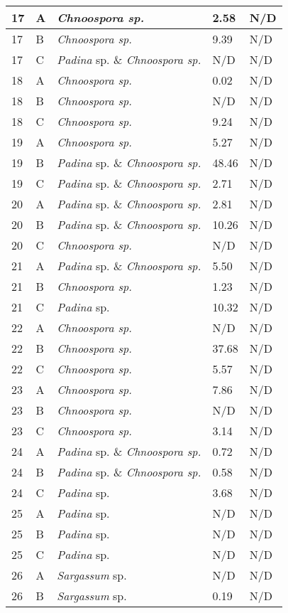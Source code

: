 \documentclass[12pt]{article}
\begin{document}
\begin{longtable}{ | p{1cm} | p{1cm} | p{3cm} | p{4cm} | p{4cm} | }
\hline
17&A&\emph{Chnoospora sp.}&2.58
&N/D\\
\hline
17&B&\emph{Chnoospora sp.}&9.39
&N/D\\
\hline
17&C&\emph{Padina} sp. \& \emph{Chnoospora sp.}&N/D&N/D\\
\hline
18&A&\emph{Chnoospora sp.}&0.02
&N/D\\
\hline
18&B&\emph{Chnoospora sp.}&N/D&N/D\\
\hline
18&C&\emph{Chnoospora sp.}&9.24
&N/D\\
\hline
19&A&\emph{Chnoospora sp.}&5.27
&N/D\\
\hline
19&B&\emph{Padina} sp. \& \emph{Chnoospora sp.}&48.46
&N/D\\
\hline
19&C&\emph{Padina} sp. \& \emph{Chnoospora sp.}&2.71
&N/D\\
\hline
20&A&\emph{Padina} sp. \& \emph{Chnoospora sp.}&2.81
&N/D\\
\hline
20&B&\emph{Padina} sp. \& \emph{Chnoospora sp.}&10.26
&N/D\\
\hline
20&C&\emph{Chnoospora sp.}&N/D&N/D\\
\hline
21&A&\emph{Padina} sp. \& \emph{Chnoospora sp.}&5.50
&N/D\\
\hline
21&B&\emph{Chnoospora sp.}&1.23
&N/D\\
\hline
21&C&\emph{Padina} sp.&10.32
&N/D\\
\hline
22&A&\emph{Chnoospora sp.}&N/D&N/D\\
\hline
22&B&\emph{Chnoospora sp.}&37.68
&N/D\\
\hline
22&C&\emph{Chnoospora sp.}&5.57
&N/D\\
\hline
23&A&\emph{Chnoospora sp.}&7.86
&N/D\\
\hline
23&B&\emph{Chnoospora sp.}&N/D&N/D\\
\hline
23&C&\emph{Chnoospora sp.}&3.14
&N/D\\
\hline
24&A&\emph{Padina} sp. \& \emph{Chnoospora sp.}&0.72
&N/D\\
\hline
24&B&\emph{Padina} sp. \& \emph{Chnoospora sp.}&0.58
&N/D\\
\hline
24&C&\emph{Padina} sp.&3.68
&N/D\\
\hline
25&A&\emph{Padina} sp.&N/D&N/D\\
\hline
25&B&\emph{Padina} sp.&N/D&N/D\\
\hline
25&C&\emph{Padina} sp.&N/D&N/D\\
\hline
26&A&\emph{Sargassum} sp.&N/D&N/D\\
\hline
26&B&\emph{Sargassum} sp.&0.19
&N/D\\

\end{longtable}
\end{document}
